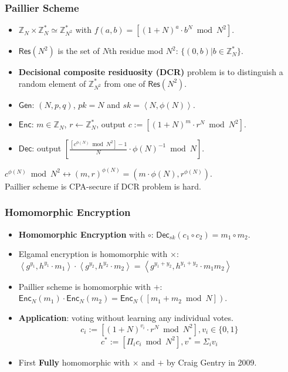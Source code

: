 \begin{frame}\frametitle{Paillier Scheme}
\begin{itemize}
\item $\mathbb{Z}_N\times \mathbb{Z}_N^* \simeq \mathbb{Z}_{N^2}^*$ with $f(a,b)=[(1+N)^a\cdot b^N \bmod N^2]$.
\item $\mathsf{Res}(N^2)$ is the set of $N$th residue mod $N^2$: $\{(0,b) | b \in \mathbb{Z}_N^*\}$.
\item \textbf{Decisional composite residuosity (DCR)} problem is to distinguish a random element of $\mathbb{Z}_{N^2}^*$ from one of $\mathsf{Res}(N^2)$. 
\end{itemize}
\begin{construction}
\begin{itemize}
\item $\mathsf{Gen}$: $(N,p,q)$, $pk = N$ and $sk=\left<N,\phi(N)\right>$.
\item $\mathsf{Enc}$: $m\in \mathbb{Z}_N$, $r\gets \mathbb{Z}_N^*$, output $c := [(1+N)^m\cdot r^N \bmod N^2]$.
\item $\mathsf{Dec}$: output $\left[ \frac{[c^{\phi(N)} \bmod N^2]-1}{N}\cdot \phi(N)^{-1} \bmod N\right]$.
\end{itemize}
\end{construction}
$c^{\phi(N)} \bmod N^2 \leftrightarrow (m,r)^{\phi(N)} = (m\cdot {\phi(N)}, r^{\phi(N)}).$ \\
Paillier scheme is CPA-secure if DCR problem is hard.
\end{frame}
\begin{frame}\frametitle{Homomorphic Encryption}
\begin{itemize}
\item \textbf{Homomorphic Encryption} with $\circ$: $\mathsf{Dec}_{sk}(c_1\circ c_2)=m_1\circ m_2$.
\item Elgamal encryption is homomorphic with $\times$: $\left<g^{y_1},h^{y_1}\cdot m_1\right>\cdot \left<g^{y_2},h^{y_2}\cdot m_2\right> = \left<g^{y_1+y_2},h^{y_1+y_2}\cdot m_1m_2\right>$
\item Paillier scheme is homomorphic with $+$: $\mathsf{Enc}_N(m_1) \cdot \mathsf{Enc}_N(m_2) = \mathsf{Enc}_N([m_1+m_2 \bmod N])$.
\item \textbf{Application}: voting without learning any individual votes.
\[c_i := [(1+N)^{v_i}\cdot r^N \bmod N^2], v_i \in \{0,1\}\]
\[c^* := [\Pi_{i} c_i \bmod N^2], v^* = \Sigma_{i} v_i \]
\item First \textbf{Fully} homomorphic with $\times$ and $+$ by Craig Gentry in 2009.
\end{itemize}
\end{frame}

